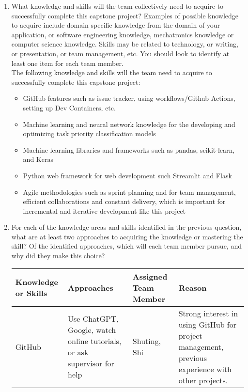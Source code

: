 \documentclass[12pt]{article}
\begin{document}
\begin{enumerate}
  \item What knowledge and skills will the team collectively need to acquire to
  successfully complete this capstone project?  Examples of possible knowledge
  to acquire include domain specific knowledge from the domain of your
  application, or software engineering knowledge, mechatronics knowledge or
  computer science knowledge.  Skills may be related to technology, or writing,
  or presentation, or team management, etc.  You should look to identify at
  least one item for each team member. \\
  
  The following knowledge and skills will the team need to acquire to successfully complete this capstone project:
  \begin{itemize}
    \item GitHub features such as issue tracker, using workflows/Github Actions, setting up Dev Containers, etc.
    \item Machine learning and neural network knowledge for the developing and optimizing task priority classification models
    \item Machine learning libraries and frameworks such as pandas, scikit-learn, and Keras
    \item Python web framework for web development such Streamlit and Flask
    \item Agile methodologies such as sprint planning and for team management, efficient collaborations and constant delivery, which is important for incremental and iterative development like this project
  \end{itemize}
  \item For each of the knowledge areas and skills identified in the previous
  question, what are at least two approaches to acquiring the knowledge or
  mastering the skill?  Of the identified approaches, which will each team
  member pursue, and why did they make this choice?
  \begin{table}[]
    \begin{tabular}{| p{3cm} | p{3.5cm} | p{2cm} | p{5cm} |}
    \hline
      \textbf{Knowledge or Skills} & \textbf{Approaches} & \textbf{Assigned Team Member} & \textbf{Reason} \\
    \hline
      GitHub & \raggedright Use ChatGPT, Google, watch online tutorials, or ask supervisor for help  & Shuting, Shi & Strong interest in using GitHub for project management, previous experience with other projects. \\

\end{tabular}
\end{table}
\end{enumerate}
\end{document}
